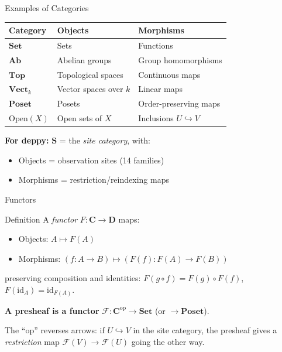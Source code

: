 \documentclass[aspectratio=169,10pt]{beamer}
\newcommand{\Fscr}{\mathcal{F}}
\newcommand{\op}{\mathrm{op}}
\newcommand{\id}{\mathrm{id}}
\newcommand{\Poset}{\mathbf{Poset}}
\newcommand{\Set}{\mathbf{Set}}
\newcommand{\Ab}{\mathbf{Ab}}
\newcommand{\Open}{\mathrm{Open}}
\begin{document}
\begin{frame}{Examples of Categories}
\renewcommand{\arraystretch}{1.4}
\begin{tabular}{@{}lll@{}}
\toprule
\textbf{Category} & \textbf{Objects} & \textbf{Morphisms} \\
\midrule
$\Set$ & Sets & Functions \\
$\Ab$ & Abelian groups & Group homomorphisms \\
$\mathbf{Top}$ & Topological spaces & Continuous maps \\
$\mathbf{Vect}_k$ & Vector spaces over $k$ & Linear maps \\
$\Poset$ & Posets & Order-preserving maps \\
$\Open(X)$ & Open sets of $X$ & Inclusions $U \hookrightarrow V$ \\
\bottomrule
\end{tabular}

\vspace{0.5em}
\textbf{For deppy:} $\mathbf{S}$ = the \emph{site category}, with:
\begin{itemize}
  \item Objects = observation sites (14 families)
  \item Morphisms = restriction/reindexing maps
\end{itemize}
\end{frame}

\begin{frame}{Functors}
\begin{block}{Definition}
A \emph{functor} $F : \mathbf{C} \to \mathbf{D}$ maps:
\begin{itemize}
  \item Objects: $A \mapsto F(A)$
  \item Morphisms: $(f: A \to B) \mapsto (F(f): F(A) \to F(B))$
\end{itemize}
preserving composition and identities:
$F(g \circ f) = F(g) \circ F(f)$, \quad $F(\id_A) = \id_{F(A)}$.
\end{block}

\vspace{0.3em}
\textbf{A presheaf is a functor} $\Fscr : \mathbf{C}^{\op} \to \Set$ (or $\to \Poset$).

The ``$\op$'' reverses arrows: if $U \hookrightarrow V$ in the site category, the presheaf gives a \emph{restriction} map $\Fscr(V) \to \Fscr(U)$ going the other way.
\end{frame}
\end{document}
